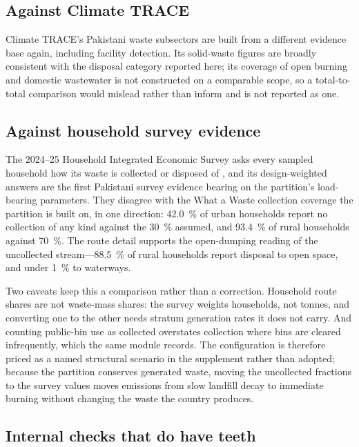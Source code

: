 \subsection{Against Climate TRACE}

Climate TRACE's Pakistani waste subsectors are built from a different evidence base again,
including facility detection. Its solid-waste figures are broadly consistent with the disposal
category reported here; its coverage of open burning and domestic wastewater is not
constructed on a comparable scope, so a total-to-total comparison would mislead rather than
inform and is not reported as one.

\subsection{Against household survey evidence}

The 2024--25 Household Integrated Economic Survey asks every sampled household how its
waste is collected or disposed of \citep{hies2025}, and its design-weighted answers are the
first Pakistani survey evidence bearing on the partition's load-bearing parameters. They
disagree with the What a Waste collection coverage the partition is built on, in one
direction: \SI{42.0}{\percent} of urban households report no collection of any kind against
the \SI{30}{\percent} assumed, and \SI{93.4}{\percent} of rural households against
\SI{70}{\percent}. The route detail supports the open-dumping reading of the uncollected
stream---\SI{88.5}{\percent} of rural households report disposal to open space, and under
\SI{1}{\percent} to waterways.

Two caveats keep this a comparison rather than a correction. Household route shares are not
waste-mass shares: the survey weights households, not tonnes, and converting one to the
other needs stratum generation rates it does not carry. And counting public-bin use as
collected overstates collection where bins are cleared infrequently, which the same module
records. The configuration is therefore priced as a named structural scenario in the
supplement rather than adopted; because the partition conserves generated waste, moving the
uncollected fractions to the survey values moves emissions from slow landfill decay to
immediate burning without changing the waste the country produces.

\subsection{Internal checks that do have teeth}

